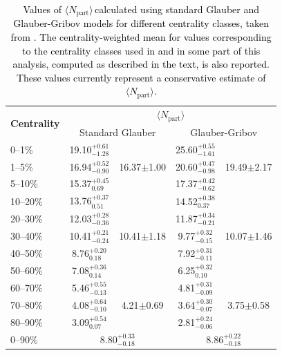 \documentclass[NOTE, atlasdraft=true, texlive=2020, UKenglish]{atlasdoc}
\newcommand{\NPART}{$\langle N_{\TN{part}} \rangle$}
\newcommand{\TN}[1]{ \text{#1} }
\begin{document}
\begin{table}
    \centering
    \begin{tabular}{|l|c|c|c|c|}
    \hline
    \multirow{2}{*}{\textbf{Centrality}} & \multicolumn{4}{c|}{\textbf{\NPART}} \\
& \multicolumn{2}{c|}{Standard Glauber} & \multicolumn{2}{c|}{Glauber-Gribov}  \\
\hline
    \rule{0pt}{2.5ex} 
    0--1\% & 19.10$^{+0.61}_{-1.28}$ & \multirow{3}{*}{16.37$\pm$1.00} & 25.60$^{+0.55}_{-1.61}$ & \multirow{3}{*}{19.49$\pm$2.17}  \\ [0.5ex]
    1--5\% & 16.94$^{+0.52}_{-0.90}$ & & 20.60$^{+0.47}_{-0.98}$ & \\[0.5ex]
    5--10\% & 15.37$^{+0.45}_{0.69}$ & & 17.37$^{+0.42}_{-0.62}$ &  \\[0.5ex]
    \hline
    \rule{0pt}{2.5ex} 
    10--20\% & 13.76$^{+0.37}_{0.51}$ & \multirow{5}{*}{10.41$\pm$1.18} & 14.52$^{+0.38}_{0.37}$ &  \multirow{5}{*}{10.07$\pm$1.46} \\[0.5ex]
20--30\% & 12.03$^{+0.28}_{-0.36}$ &  & 11.87$^{+0.34}_{-0.21}$ &   \\[0.5ex] 
    30--40\% & 10.41$^{+0.21}_{-0.24}$ & & 9.77$^{+0.32}_{-0.15}$ & \\[0.5ex]
    40--50\% & 8.76$^{+0.20}_{0.18}$ & & 7.92$^{+0.31}_{-0.11}$ &  \\[0.5ex]
    50--60\% & 7.08$^{+0.36}_{0.14}$ & & 6.25$^{+0.32}_{0.10}$ &  \\[0.5ex]
    \hline
    \rule{0pt}{2.5ex} 
    60--70\% & 5.46$^{+0.55}_{-0.13}$ & \multirow{3}{*}{4.21$\pm$0.69} & 4.81$^{+0.31}_{-0.09}$ & \multirow{3}{*}{3.75$\pm$0.58}  \\[0.5ex]
    70--80\% & 4.08$^{+0.64}_{-0.10}$ & & 3.64$^{+0.30}_{-0.07}$ & \\[0.5ex]
    80--90\% & 3.09$^{+0.54}_{0.07}$ & & 2.81$^{+0.24}_{-0.06}$ &  \\[0.5ex]
    \hline
    \rule{0pt}{2.5ex}
    0--90\%& \multicolumn{2}{c|}{8.80$^{+0.33}_{-0.18}$} & \multicolumn{2}{c|}{8.86$^{+0.22}_{-0.18}$}  \\[0.5ex]
    \hline
    \end{tabular}
    \vspace{0.5cm}
    \caption{ \textcolor{black}{ 
    Values of \NPART\,calculated using standard Glauber and Glauber-Gribov models for different centrality classes, taken from \cite{Hill:2301540}. The centrality-weighted mean for values corresponding to the centrality classes used in \cite{ATLAS:2023zfx} and in some part of this analysis, computed as described in the text, is also reported. These values currently represent a conservative estimate of \NPART. } 
    }
    \label{tab:npart}
\end{table}
\end{document}
